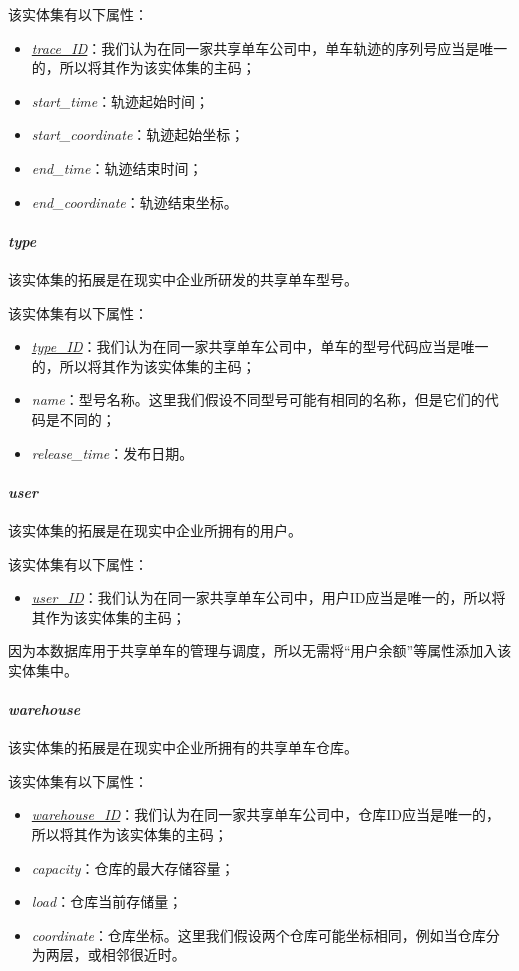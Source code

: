 该实体集有以下属性：
\begin{itemize}
  \item \textit{\underline{trace\_ID}}：我们认为在同一家共享单车公司中，单车轨迹的序列号应当是唯一的，所以将其作为该实体集的主码；
  \item \textit{start\_time}：轨迹起始时间；
  \item \textit{start\_coordinate}：轨迹起始坐标；
  \item \textit{end\_time}：轨迹结束时间；
  \item \textit{end\_coordinate}：轨迹结束坐标。
\end{itemize}
\paragraph{\textit{type}}
该实体集的拓展是在现实中企业所研发的共享单车型号。

该实体集有以下属性：
\begin{itemize}
  \item \textit{\underline{type\_ID}}：我们认为在同一家共享单车公司中，单车的型号代码应当是唯一的，所以将其作为该实体集的主码；
  \item \textit{name}：型号名称。这里我们假设不同型号可能有相同的名称，但是它们的代码是不同的；
  \item \textit{release\_time}：发布日期。
\end{itemize}
\paragraph{\textit{user}}
该实体集的拓展是在现实中企业所拥有的用户。

该实体集有以下属性：
\begin{itemize}
  \item \textit{\underline{user\_ID}}：我们认为在同一家共享单车公司中，用户ID应当是唯一的，所以将其作为该实体集的主码；
\end{itemize}

因为本数据库用于共享单车的管理与调度，所以无需将“用户余额”等属性添加入该实体集中。
\paragraph{\textit{warehouse}}
该实体集的拓展是在现实中企业所拥有的共享单车仓库。

该实体集有以下属性：
\begin{itemize}
  \item \textit{\underline{warehouse\_ID}}：我们认为在同一家共享单车公司中，仓库ID应当是唯一的，所以将其作为该实体集的主码；
  \item \textit{capacity}：仓库的最大存储容量；
  \item \textit{load}：仓库当前存储量；
  \item \textit{coordinate}：仓库坐标。这里我们假设两个仓库可能坐标相同，例如当仓库分为两层，或相邻很近时。
\end{itemize}
